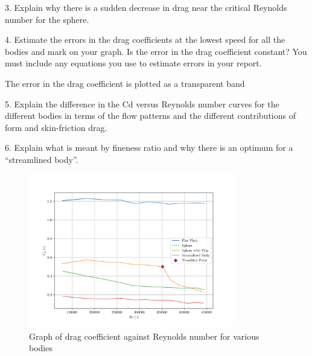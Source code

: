 \documentclass[8pt]{article}
\begin{document}
3. Explain why there is a sudden decrease in drag near the critical Reynolds number for the
sphere.

4. Estimate the errors in the drag coefficients at the lowest speed for all the bodies and
mark on your graph. Is the error in the drag coefficient constant? You must include any
equations you use to estimate errors in your report.

The error in the drag coefficient is plotted as a transparent band 

5. Explain the difference in the Cd versus Reynolds number curves for the different bodies in
terms of the flow patterns and the different contributions of form and skin-friction drag.

6. Explain what is meant by fineness ratio and why there is an optimum for a “streamlined
body”.


\begin{figure}[H]
    \centering
    \includegraphics[width=0.8\textwidth]{Re_vs_Cd.png}
    \caption{Graph of drag coefficient against Reynolds number for various bodies}
    \label{fig:figure1}
\end{figure}
\end{document}
